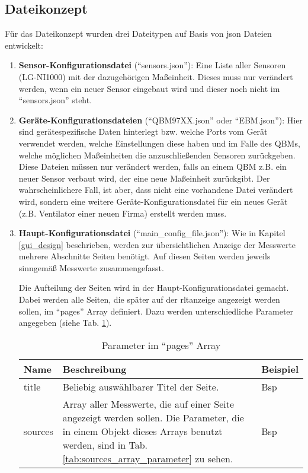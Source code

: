 \subsection{Dateikonzept} \label{json_config_files}
Für das Dateikonzept wurden drei Dateitypen auf Basis von \acs{json} Dateien entwickelt:


\begin{enumerate}

	\item \textbf{Sensor-Konfigurationsdatei} (\enquote{sensors.json}): Eine Liste aller Sensoren (\zB LG-NI1000) mit der dazugehörigen Maßeinheit. Dieses muss nur verändert werden, wenn ein neuer Sensor eingebaut wird und dieser noch nicht im \enquote{sensors.json} steht.
	
	\item \textbf{Geräte-Konfigurationsdateien} (\zB \enquote{QBM97XX.json} oder \enquote{EBM.json}): Hier sind gerätespezifische Daten hinterlegt bzw. welche Ports vom Gerät verwendet werden, welche Einstellungen diese haben und im Falle des QBMs, welche möglichen Maßeinheiten die anzuschließenden Sensoren zurückgeben. Diese Dateien müssen nur verändert werden, falls an einem QBM z.B. ein neuer Sensor verbaut wird, der eine neue Maßeinheit zurückgibt. Der wahrscheinlichere Fall, ist aber, dass nicht eine vorhandene Datei verändert wird, sondern eine weitere Geräte-Konfigurationsdatei für ein neues Gerät (z.B. Ventilator einer neuen Firma) erstellt werden muss.
	
	\item \textbf{Haupt-Konfigurationsdatei} (\enquote{main\_config\_file.json}): Wie in Kapitel \ref{gui_design} beschrieben, werden zur übersichtlichen  Anzeige der Messwerte mehrere Abschnitte \bzw Seiten benötigt. Auf diesen Seiten werden jeweils sinngemäß Messwerte zusammengefasst. 
	
	Die Aufteilung der Seiten wird in der Haupt-Konfigurationsdatei gemacht. Dabei werden alle Seiten, die später auf der \acs{rltanzeige} angezeigt werden sollen, im \enquote{pages} Array definiert. Dazu werden unterschiedliche Parameter angegeben (siehe Tab. \ref{tab:pages_array_parameter}).

		\begin{table}[H]
			\caption{Parameter im \enquote{pages} Array}
			\label{tab:pages_array_parameter}
			\begin{tabularx}{\textwidth}{@{}lX|X@{}}
				\toprule
				\textbf{Name} & \textbf{Beschreibung} & \textbf{Beispiel} \\
				\midrule
				title      	& Beliebig auswählbarer Titel der Seite. &  Bsp
				\\
				sources 	& Array aller Messwerte, die auf einer Seite angezeigt werden sollen. Die Parameter, die in einem Objekt dieses Arrays benutzt werden, sind in Tab. \ref{tab:sources_array_parameter} zu sehen. & Bsp
				\\
				\bottomrule
			\end{tabularx}
		\end{table}
		

\end{enumerate}
